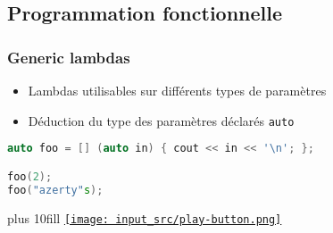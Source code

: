 \documentclass[C++.tex]{subfiles}
\begin{document}
\subsection*{Programmation fonctionnelle}
\begin{frame}[fragile]
	\frametitle{Generic lambdas}
	\begin{itemize}
		\item Lambdas utilisables sur différents types de paramètres
		\item Déduction du type des paramètres déclarés \lstinline|auto|
	\end{itemize}

	\begin{lstlisting}[language=C++]
auto foo = [] (auto in) { cout << in << '\n'; };

foo(2);
foo("azerty"s);\end{lstlisting}

	\vskip 10mm plus 10fill
	\hfill
	\href{https://godbolt.org/#g:!((g:!((g:!((h:codeEditor,i:(filename:'1',fontScale:14,fontUsePx:'0',j:1,lang:c%2B%2B,selection:(endColumn:1,endLineNumber:12,positionColumn:1,positionLineNumber:12,selectionStartColumn:1,selectionStartLineNumber:8,startColumn:1,startLineNumber:8),source:'%23include+%3Ciostream%3E%0A%23include+%3Cstring%3E%0A%0Ausing+namespace+std::literals%3B%0A%0Aint+main()%0A%7B%0A++auto+foo+%3D+%5B%5D+(auto+in)+%7B+std::cout+%3C%3C+in+%3C%3C+!'%5Cn!'%3B+%7D%3B%0A%0A++foo(2)%3B%0A++foo(%22azerty%22s)%3B%0A%7D%0A'),l:'5',n:'0',o:'C%2B%2B+source+%231',t:'0')),k:50,l:'4',n:'0',o:'',s:0,t:'0'),(g:!((h:executor,i:(argsPanelShown:'1',compilationPanelShown:'0',compiler:g122,compilerName:'',compilerOutShown:'0',execArgs:'',execStdin:'',fontScale:14,fontUsePx:'0',j:1,lang:c%2B%2B,libs:!((name:boost,ver:'175')),options:'-std%3Dc%2B%2B14+-Wall+-Wextra',source:1,stdinPanelShown:'1',tree:'1',wrap:'0'),l:'5',n:'0',o:'Executor+x86-64+gcc+12.2+(C%2B%2B,+Editor+%231)',t:'0')),header:(),k:50,l:'4',n:'0',o:'',s:0,t:'0')),l:'2',n:'0',o:'',t:'0')),version:4}{\texttt{[image: input\_src/play-button.png]}}
\end{frame}
\end{document}
